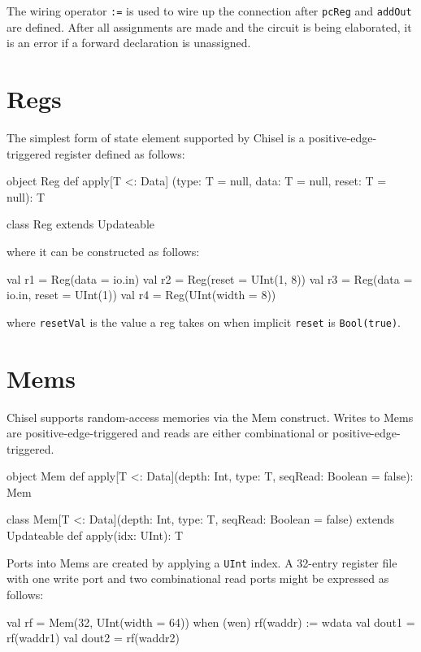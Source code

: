 \documentclass[10pt,twocolumn]{article}
\def\code#1{{\small\tt #1}}
\begin{document}
\noindent
The wiring operator
\verb!:=! is used to wire up
the connection after \verb!pcReg! and \verb!addOut! are defined.
After all assignments are made and the circuit is being elaborated, 
it is an error if a forward declaration is unassigned.

\section{Regs}

The simplest form of state element supported by Chisel is a
positive-edge-triggered register defined as follows:

\begin{scala}
object Reg {
  def apply[T <: Data]
    (type: T = null, 
     data: T = null, 
     reset: T = null): T
}

class Reg extends Updateable
\end{scala}

\noindent
where it can be constructed as follows:

\begin{scala}
val r1 = Reg(data = io.in)
val r2 = Reg(reset = UInt(1, 8))
val r3 = Reg(data = io.in, reset = UInt(1))
val r4 = Reg(UInt(width = 8))
\end{scala}

\noindent
where \code{resetVal} is the value a reg takes on when implicit
\code{reset} is \code{Bool(true)}.

\section{Mems}

Chisel supports random-access memories via the Mem construct.  Writes to Mems
are positive-edge-triggered and reads are either combinational or
positive-edge-triggered.  

\begin{scala}
object Mem {
  def apply[T <: Data](depth: Int, type: T,
          seqRead: Boolean = false): Mem
}

class Mem[T <: Data](depth: Int, type: T,
      seqRead: Boolean = false)
    extends Updateable {
  def apply(idx: UInt): T
}
\end{scala}

Ports into Mems are created by applying a \code{UInt} index.  A 32-entry
register file with one write port and two combinational read ports might be
expressed as follows:

\begin{scala}
val rf = Mem(32, UInt(width = 64))
when (wen) { rf(waddr) := wdata }
val dout1 = rf(waddr1)
val dout2 = rf(waddr2)
\end{scala}
\end{document}
